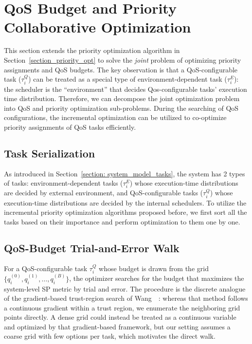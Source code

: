 	\section{QoS Budget and Priority Collaborative Optimization}
	\label{section_config_opt}

    This section extends the priority optimization algorithm in Section~\ref{section_priority_opt} to solve the \emph{joint} problem of optimizing priority assignments and QoS budgets.
    The key observation is that a QoS-configurable task ($\tau^Q_i$) can be treated as a special type of environment-dependent task ($\tau^E_i$): the scheduler is the ``environment'' that decides Qos-configurable tasks' execution time distribution.
    Therefore, we can decompose the joint optimization problem into QoS and priority optimization sub-problems.
    During the searching of QoS configurations, the incremental optimization can be utilized to co-optimize priority assignments of QoS tasks efficiently.

    \subsection{Task Serialization}
    \label{section_task_serialization}

    As introduced in Section~\ref{section: system_model_tasks}, the system has 2 types of tasks: environment-dependent tasks ($\tau^E_i$) whose execution-time distributions are decided by external environment, 
    and QoS-configurable tasks ($\tau^Q_i$) whose execution-time distributions are decided by the internal schedulers.
    To utilize the incremental priority optimization algorithms proposed before, we first sort all the tasks based on their importance and perform optimization to them one by one.

    
    \subsection{QoS-Budget Trial-and-Error Walk}
    \label{section_qos_walk}
    For a QoS-configurable task $\tau^Q_i$ whose budget is drawn from the grid $\{q_i^{(0)}, q_i^{(1)}, \dots, q_i^{(B)}\}$, the optimizer searches for the budget that maximizes the system-level SP metric by trial and error.
    The procedure is the discrete analogue of the gradient-based trust-region search of Wang~\etal~\cite{Wang2023RTAS}: whereas that method follows a continuous gradient within a trust region, we enumerate the neighboring grid points directly.
    A dense grid could instead be treated as a continuous variable and optimized by that gradient-based framework, but our setting assumes a coarse grid with few options per task, which motivates the direct walk.

